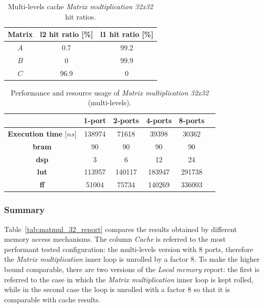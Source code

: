 \documentclass[11pt,a4paper,oneside]{memoir}
\begin{document}
\begin{table}[H]
	\begin{center}
		\begin{tabular}{ccc}
			\hline
			\rowcolor{gray!50}
			\textbf{Matrix} & \textbf{\ac{l2} hit ratio} [\%] &
			\textbf{\ac{l1} hit ratio} [\%] \\
			\hline
			$A$ & 0.7 & 99.2 \\
			\rowcolor{gray!25}
			$B$ & 0 & 99.9 \\
			$C$ & 96.9 & 0 \\
			\hline
		\end{tabular}
	\end{center}
	\caption{Multi-levels cache \emph{Matrix multiplication 32x32} hit
	ratios.}
	\label{tab:matmul_32_l1_hit_ratio}
\end{table}

\begin{table}[H]
	\begin{center}
		\begin{tabular}{cccccc}
			\hline
			\rowcolor{gray!50}
			& \textbf{1-port} & \textbf{2-ports} & \textbf{4-ports}
			& \textbf{8-ports} \\
			\hline
			\textbf{Execution time} [$ns$] & 138974 & 71618 & 39398
			& 30362 \\
			\rowcolor{gray!25}
			\textbf{\ac{bram}} & 90 & 90 & 90 & 90 \\
			\textbf{\acs{dsp}} & 3 & 6 & 12 & 24 \\
			\rowcolor{gray!25}
			\textbf{\acs{lut}} & 113957 & 140117 & 183947 & 291738 \\
			\textbf{\acs{ff}} & 51004 & 75734 & 140269 & 336003 \\
			\hline
		\end{tabular}
	\end{center}
	\caption{Performance and resource usage of \emph{Matrix multiplication
	32x32} (multi-levels).}
	\label{tab:matmul_32_l1_report}
\end{table}

\subsubsection{Summary}
Table~\ref{tab:matmul_32_report} compares the results obtained by different
memory access mechanisms.
The column \emph{Cache} is referred to the most performant tested configuration:
the multi-levels version with 8 ports, therefore the \emph{Matrix
multiplication} inner loop is unrolled by a factor 8.
To make the higher bound comparable, there are two versions of the \emph{Local
memory} report: the first is referred to the case in which the \emph{Matrix
multiplication} inner loop is kept rolled, while in the second case the loop is
unrolled with a factor 8 so that it is comparable with cache results.
\end{document}
